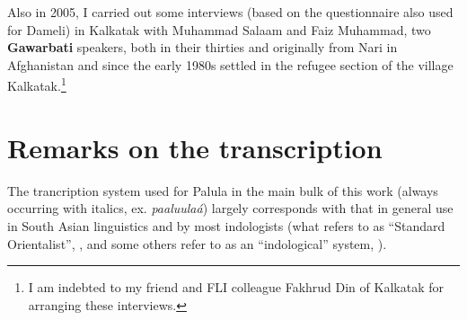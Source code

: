 Also in 2005, I carried out some interviews (based on the questionnaire also used for Dameli) in Kalkatak with Muhammad Salaam and Faiz Muhammad, two \textbf{Gawarbati} speakers, both in their thirties and originally from Nari in Afghanistan and since the early 1980s settled in the refugee section of the village Kalkatak.\footnote{I am indebted to my friend and FLI colleague Fakhrud Din of Kalkatak for arranging these interviews.}


\section{Remarks on the transcription}
\label{sec:1-7}

The trancription system used for Palula in the main bulk of this work (always occurring with
italics, ex. \textit{paaluulaá}) largely corresponds with that in general use in South Asian
linguistics and by most indologists (what \citeauthor{masica1991} refers to as ``Standard
Orientalist'', \citeyear[xv]{masica1991}, and some others refer to as an ``indological'' system,
\citealt[9]{radloff1999}).



